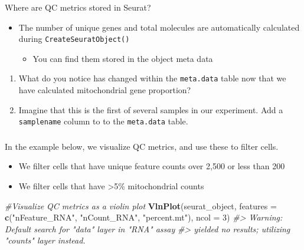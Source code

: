 \documentclass[
]{book}
\newenvironment{Shaded}{\begin{snugshade}}{\end{snugshade}}
\newcommand{\AttributeTok}[1]{\textcolor[rgb]{0.13,0.29,0.53}{#1}}
\newcommand{\CommentTok}[1]{\textcolor[rgb]{0.56,0.35,0.01}{\textit{#1}}}
\newcommand{\DecValTok}[1]{\textcolor[rgb]{0.00,0.00,0.81}{#1}}
\newcommand{\FunctionTok}[1]{\textcolor[rgb]{0.13,0.29,0.53}{\textbf{#1}}}
\newcommand{\NormalTok}[1]{#1}
\newcommand{\StringTok}[1]{\textcolor[rgb]{0.31,0.60,0.02}{#1}}
\providecommand{\tightlist}{%
  \setlength{\itemsep}{0pt}\setlength{\parskip}{0pt}}
\begin{document}
Where are QC metrics stored in Seurat?

\begin{itemize}
\tightlist
\item
  The number of unique genes and total molecules are automatically calculated during \texttt{CreateSeuratObject()}

  \begin{itemize}
  \tightlist
  \item
    You can find them stored in the object meta data
  \end{itemize}
\end{itemize}

\begin{enumerate}
\def\labelenumi{\arabic{enumi}.}
\item
  What do you notice has changed within the \texttt{meta.data} table now that we have calculated mitochondrial gene proportion?
\item
  Imagine that this is the first of
  several samples in our experiment. Add a \texttt{samplename} column to to the \texttt{meta.data} table.
\end{enumerate}

\hypertarget{section-2}{%
\subsubsection*{}\label{section-2}}

In the example below, we visualize QC metrics, and use these to filter cells.

\begin{itemize}
\tightlist
\item
  We filter cells that have unique feature counts over 2,500 or less than 200
\item
  We filter cells that have \textgreater5\% mitochondrial counts
\end{itemize}

\begin{Shaded}
\begin{Highlighting}[]
\CommentTok{\#Visualize QC metrics as a violin plot}
\FunctionTok{VlnPlot}\NormalTok{(seurat\_object, }\AttributeTok{features =} \FunctionTok{c}\NormalTok{(}\StringTok{"nFeature\_RNA"}\NormalTok{, }\StringTok{"nCount\_RNA"}\NormalTok{, }\StringTok{"percent.mt"}\NormalTok{), }\AttributeTok{ncol =} \DecValTok{3}\NormalTok{)}
\CommentTok{\#\textgreater{} Warning: Default search for "data" layer in "RNA" assay}
\CommentTok{\#\textgreater{} yielded no results; utilizing "counts" layer instead.}
\end{Highlighting}
\end{Shaded}
\end{document}
